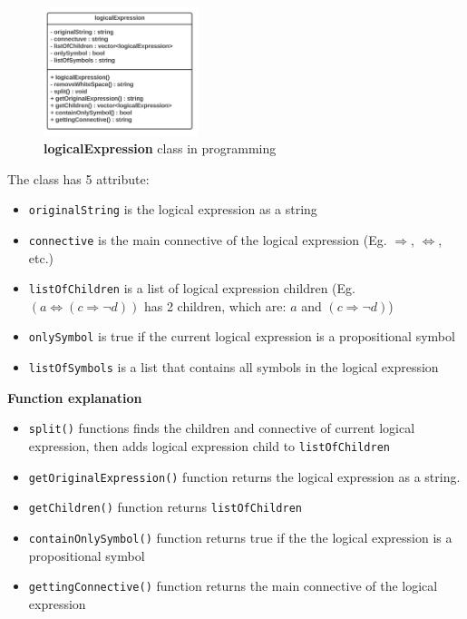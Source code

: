 \documentclass{assignment}
\begin{document}
\begin{figure}[h]
    \centering
    \includegraphics[width=0.4\textwidth]{./assets/logicalExpression.png}
    \caption{\textbf{logicalExpression} class in programming}
    \label{fig:fig11}
\end{figure}

The class has 5 attribute:

\begin{itemize}
	\item \texttt{originalString} is the logical expression as a string
	\item \texttt{connective} is the main connective of the logical expression (Eg. $\Rightarrow$, $\iff$, etc.)
	\item \texttt{listOfChildren} is a list of logical expression children (Eg. $(a \iff (c \Rightarrow \neg d))$ has 2 children, which are: $a$ and $(c \Rightarrow \neg d)$)
	\item \texttt{onlySymbol} is true if the current logical expression is a propositional symbol
	\item \texttt{listOfSymbols} is a list that contains all symbols in the logical expression
\end{itemize}

\textbf{Function explanation}

\begin{itemize}
	\item \texttt{split()} functions finds the children and connective of current logical expression, then adds logical expression child to \texttt{listOfChildren}
	\item \texttt{getOriginalExpression()} function returns the logical expression as a string.
	\item \texttt{getChildren()} function returns \texttt{listOfChildren}
	\item \texttt{containOnlySymbol()} function returns true if the the logical expression is a propositional symbol
	\item \texttt{gettingConnective()} function returns the main connective of the logical expression
\end{itemize}
\end{document}
